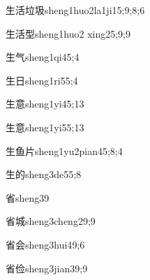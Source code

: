 \begin{verbete}{生活垃圾}{sheng1huo2la1ji1}{5;9;8;6}
\end{verbete}

\begin{verbete}{生活型}{sheng1huo2 xing2}{5;9;9}
\end{verbete}

\begin{verbete}{生气}{sheng1qi4}{5;4}
\end{verbete}

\begin{verbete}{生日}{sheng1ri5}{5;4}
\end{verbete}

\begin{verbete}{生意}{sheng1yi4}{5;13}
\end{verbete}

\begin{verbete}{生意}{sheng1yi5}{5;13}
\end{verbete}

\begin{verbete}{生鱼片}{sheng1yu2pian4}{5;8;4}
\end{verbete}

\begin{verbete}{生的}{sheng3de5}{5;8}
\end{verbete}

\begin{verbete}{省}{sheng3}{9}
\end{verbete}

\begin{verbete}{省城}{sheng3cheng2}{9;9}
\end{verbete}

\begin{verbete}{省会}{sheng3hui4}{9;6}
\end{verbete}

\begin{verbete}{省俭}{sheng3jian3}{9;9}
\end{verbete}

